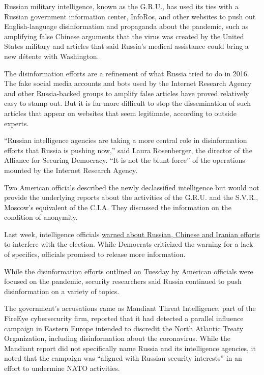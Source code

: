 Russian military intelligence, known as the G.R.U., has used its ties
with a Russian government information center, InfoRos, and other
websites to push out English-language disinformation and propaganda
about the pandemic, such as amplifying false Chinese arguments that the
virus was created by the United States military and articles that said
Russia's medical assistance could bring a new détente with Washington.

The disinformation efforts are a refinement of what Russia tried to do
in 2016. The fake social media accounts and bots used by the Internet
Research Agency and other Russia-backed groups to amplify false articles
have proved relatively easy to stamp out. But it is far more difficult
to stop the dissemination of such articles that appear on websites that
seem legitimate, according to outside experts.

``Russian intelligence agencies are taking a more central role in
disinformation efforts that Russia is pushing now,'' said Laura
Rosenberger, the director of the Alliance for Securing Democracy. ``It
is not the blunt force'' of the operations mounted by the Internet
Research Agency.

Two American officials described the newly declassified intelligence but
would not provide the underlying reports about the activities of the
G.R.U. and the S.V.R., Moscow's equivalent of the C.I.A. They discussed
the information on the condition of anonymity.

Last week, intelligence officials
\href{https://www.nytimes.com/2020/07/24/us/politics/election-interference-russia-china-iran.html}{warned
about Russian, Chinese and Iranian efforts} to interfere with the
election. While Democrats criticized the warning for a lack of
specifics, officials promised to release more information.

While the disinformation efforts outlined on Tuesday by American
officials were focused on the pandemic, security researchers said Russia
continued to push disinformation on a variety of topics.

The government's accusations came as Mandiant Threat Intelligence, part
of the FireEye cybersecurity firm, reported that it had detected a
parallel influence campaign in Eastern Europe intended to discredit the
North Atlantic Treaty Organization, including disinformation about the
coronavirus. While the Mandiant report did not specifically name Russia
and its intelligence agencies, it noted that the campaign was ``aligned
with Russian security interests'' in an effort to undermine NATO
activities.

